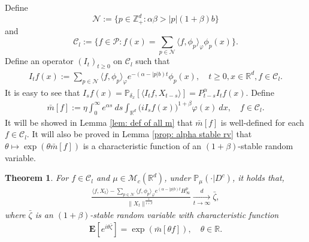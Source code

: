 \documentclass[12pt,a4paper]{amsart}
\theoremstyle{plain}
\newtheorem{thm}{Theorem}[section]
\theoremstyle{definition}
\numberwithin{equation}{section}
\begin{document}
Define
\begin{equation}
\label{eq: def of N}
    \mathcal{N}:=\{p\in \mathbb{Z}_+^d:  \alpha\beta>|p|(1+\beta)b\}
\end{equation}
    and
\begin{equation}
\label{eq: def of Cl}
    \mathcal{C}_l:=\Big\{f\in \mathcal P: f(x)=\sum_{p\in\mathcal{N}}\langle f, \phi_p\rangle_{\varphi}\phi_p(x)\Big\}.
\end{equation}
    Define an operator $(I_t)_{t\geq 0}$ on $\mathcal{C}_l$ such that
\begin{align}\label{definition of Itf}
    I_tf(x)
    :=\sum_{p\in \mathcal{N}}\langle f, \phi_p\rangle_{\varphi} e^{-(\alpha-|p|b)t}\phi_p(x), 
    \quad t\geq 0, x\in \mathbb{R}^d, f\in \mathcal C_l.
\end{align}
    It is easy to see that $I_sf(x)=\mathbb{P}_{\delta_x}[\langle I_t f, X_{t-s}\rangle]=P_{t-s}^{\alpha}I_tf(x)$.
    Define
\begin{align}\label{bar-m}
   \bar{m}[f]
   :=\eta \int_{0}^{\infty} e^{\alpha s}~ds \int_{\mathbb R^d} \big(iI_sf(x)\big)^{1+\beta}\varphi(x)~dx,
   \quad f\in \mathcal C_l.
\end{align}
    It will be showed in Lemma \ref{lem: def of all m} that $\bar{m}[f]$ is well-defined for each $f\in \mathcal C_l$.
    It will also be proved in Lemma \ref{prop: alpha stable rv} that $\theta \mapsto \exp(\theta \bar m[f])$ is a characteristic function of an $(1+\beta)$-stable random variable.
\begin{thm}
\label{thm: large clt}
    For $f\in\mathcal{C}_l$ and $\mu\in \mathcal{M}_c(\mathbb{R}^d)$, under $\mathbb{P}_{\mu}(\cdot|D^c)$, it holds that,
\begin{align}\label{thm: large rate}
    \frac{\langle f, X_t\rangle-\sum_{p\in\mathcal{N}}\langle f,\phi_p\rangle_\varphi e^{(\alpha-|p|b)t}H^p_{\infty}}{\|X_t\|^\frac{1}{1+\beta}}\xrightarrow[t\to \infty]{d}\bar{\zeta},
\end{align}
    where $\bar{\zeta}$ is an $(1+\beta)$-stable random variable with characteristic function
\begin{align}
    \mathbf{E}[e^{i\theta\bar{\zeta}}]=\exp(\bar{m}[\theta f]),\quad \theta\in \mathbb{R}.
\end{align}
\end{thm}
\end{document}
